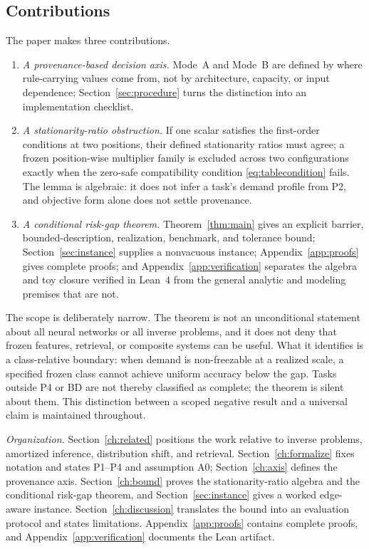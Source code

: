 \documentclass[twoside,11pt]{article}
\begin{document}
\subsection{Contributions}

The paper makes three contributions.
\begin{enumerate}
\item \emph{A provenance-based decision axis.} Mode~A and Mode~B are defined by where rule-carrying values come from, not by architecture, capacity, or input dependence; Section~\ref{sec:procedure} turns the distinction into an implementation checklist.
\item \emph{A stationarity-ratio obstruction.} If one scalar satisfies the first-order conditions at two positions, their defined stationarity ratios must agree; a frozen position-wise multiplier family is excluded across two configurations exactly when the zero-safe compatibility condition \eqref{eq:tablecondition} fails. The lemma is algebraic: it does not infer a task's demand profile from P2, and objective form alone does not settle provenance.
\item \emph{A conditional risk-gap theorem.} Theorem~\ref{thm:main} gives an explicit barrier, bounded-description, realization, benchmark, and tolerance bound; Section~\ref{sec:instance} supplies a nonvacuous instance; Appendix~\ref{app:proofs} gives complete proofs; and Appendix~\ref{app:verification} separates the algebra and toy closure verified in Lean~4 from the general analytic and modeling premises that are not.
\end{enumerate}

The scope is deliberately narrow. The theorem is not an unconditional statement about all neural networks or all inverse problems, and it does not deny that frozen features, retrieval, or composite systems can be useful. What it identifies is a class-relative boundary: when demand is non-freezable at a realized scale, a specified frozen class cannot achieve uniform accuracy below the gap. Tasks outside P4 or BD are not thereby classified as complete; the theorem is silent about them. This distinction between a scoped negative result and a universal claim is maintained throughout.

\emph{Organization.}
Section~\ref{ch:related} positions the work relative to inverse problems, amortized inference, distribution shift, and retrieval. Section~\ref{ch:formalize} fixes notation and states P1--P4 and assumption A0; Section~\ref{ch:axis} defines the provenance axis. Section~\ref{ch:bound} proves the stationarity-ratio algebra and the conditional risk-gap theorem, and Section~\ref{sec:instance} gives a worked edge-aware instance. Section~\ref{ch:discussion} translates the bound into an evaluation protocol and states limitations. Appendix~\ref{app:proofs} contains complete proofs, and Appendix~\ref{app:verification} documents the Lean artifact.
\end{document}
